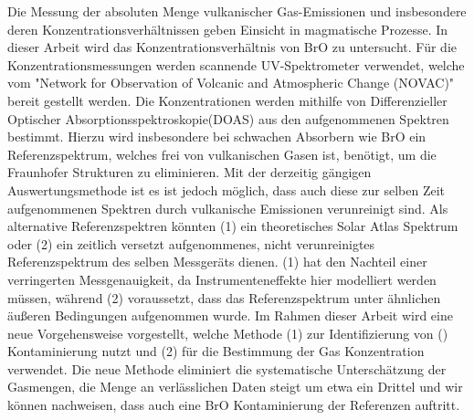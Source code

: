 Die Messung der absoluten Menge vulkanischer Gas-Emissionen und insbesondere deren Konzentrationsverhältnissen geben Einsicht in magmatische Prozesse.
In dieser Arbeit wird das Konzentrationsverhältnis von BrO zu  untersucht.
Für die Konzentrationsmessungen werden scannende UV-Spektrometer verwendet, welche vom "Network for Observation of Volcanic and Atmospheric Change (NOVAC)" bereit gestellt werden.
Die Konzentrationen werden mithilfe von Differenzieller Optischer Absorptionsspektroskopie(DOAS) aus den aufgenommenen Spektren bestimmt. Hierzu wird insbesondere bei schwachen Absorbern wie BrO ein Referenzspektrum, welches frei von vulkanischen Gasen ist, benötigt, um die Fraunhofer Strukturen zu eliminieren. Mit der derzeitig gängigen Auswertungsmethode ist es ist jedoch möglich, dass auch diese zur selben Zeit aufgenommenen Spektren durch vulkanische Emissionen verunreinigt sind. Als alternative Referenzspektren könnten (1) ein theoretisches Solar Atlas Spektrum oder (2) ein zeitlich versetzt aufgenommenes, nicht verunreinigtes Referenzspektrum des selben Messgeräts dienen. (1) hat den Nachteil einer verringerten Messgenauigkeit, da Instrumenteneffekte hier modelliert werden müssen, während (2) voraussetzt, dass das Referenzspektrum unter ähnlichen äußeren Bedingungen aufgenommen wurde. Im Rahmen dieser Arbeit wird eine neue Vorgehensweise vorgestellt, welche Methode (1) zur Identifizierung von () Kontaminierung nutzt und (2) für die Bestimmung der Gas Konzentration verwendet. Die neue Methode eliminiert  die systematische Unterschätzung der Gasmengen, die Menge an verlässlichen Daten steigt um etwa ein Drittel und wir können nachweisen, dass auch eine BrO Kontaminierung der Referenzen auftritt.



